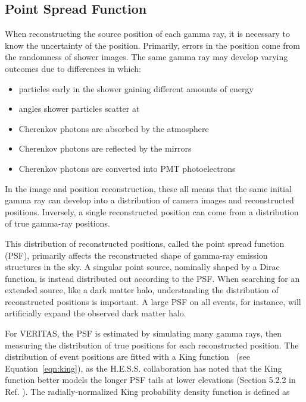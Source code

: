   \FloatBarrier

  \subsection{Point Spread Function}\label{subsec:psf}

    When reconstructing the source position of each gamma ray, it is necessary to know the uncertainty of the position.
    Primarily, errors in the position come from the randomness of shower images.
    The same gamma ray may develop varying outcomes due to differences in which:
    \begin{itemize}[label=$\bullet$]
      \item particles early in the shower gaining different amounts of energy
      \item angles shower particles scatter at
      \item Cherenkov photons are absorbed by the atmosphere
      \item Cherenkov photons are reflected by the mirrors
      \item Cherenkov photons are converted into PMT photoelectrons
    \end{itemize}
    In the image and position reconstruction, these all means that the same initial gamma ray can develop into a distribution of camera images and reconstructed positions.
    Inversely, a single reconstructed position can come from a distribution of true gamma-ray positions.

    This distribution of reconstructed positions, called the point spread function (PSF), primarily affects the reconstructed shape of gamma-ray emission structures in the sky.
    A singular point source, nominally shaped by a Dirac function, is instead distributed out according to the PSF.
    When searching for an extended source, like a dark matter halo, understanding the distribution of reconstructed positions is important.
    A large PSF on all events, for instance, will artificially expand the observed dark matter halo.

    For VERITAS, the PSF is estimated by simulating many gamma rays, then measuring the distribution of true positions for each reconstructed position.
    The distribution of event positions are fitted with a King function~\cite{king1962} (see Equation~\ref{eqn:king}), as the H.E.S.S. collaboration has noted that the King function better models the longer PSF tails at lower elevations (Section 5.2.2 in Ref. \cite{Mayer2015}).
    The radially-normalized King probability density function is defined as

